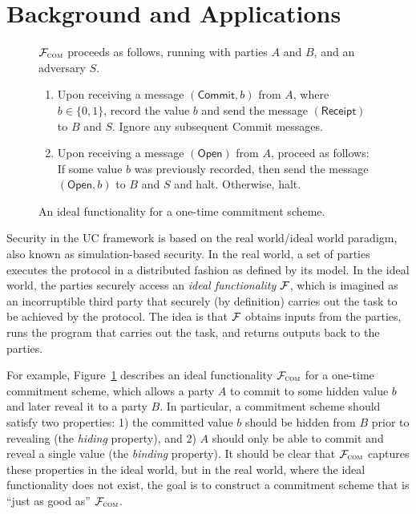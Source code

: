\section{Background and Applications}
\label{sec:background}

\begin{figure}
\begin{func}
    $\mathcal{{F}}_{\textsc{com}}$ proceeds as follows, running with parties $A$ and
  $B$, and an adversary $S$.
    \begin{enumerate}
        \item Upon receiving a message $(\mathsf{Commit}, b)$ from $A$, where $b
          \in \{ 0, 1 \}$, record the value $b$ and send the message
          $(\mathsf{Receipt})$ to $B$ and $S$. Ignore any subsequent
          \textsf{Commit} messages.
        \item Upon receiving a message $(\mathsf{Open})$ from $A$, proceed as
          follows: If some value $b$ was previously recorded, then send the
          message $(\mathsf{Open}, b)$ to $B$ and $S$ and halt. Otherwise, halt.
    \end{enumerate}
\end{func}
\caption{An ideal functionality for a one-time commitment scheme.}
\label{func:com}
\end{figure}

Security in the UC framework is based on the real world/ideal world paradigm,
also known as simulation-based security. In the real world, a set of parties
executes the protocol in a distributed fashion as defined by its model. In the
ideal world, the parties securely access an \emph{ideal functionality} $\mathcal{{F}}$,
which is imagined as an incorruptible third party that securely (by definition)
carries out the task to be achieved by the protocol. The idea is that $\mathcal{{F}}$
obtains inputs from the parties, runs the program that carries out the task, and
returns outputs back to the parties.

For example, Figure~\ref{func:com} describes an ideal functionality
$\mathcal{{F}}_{\textsc{com}}$ for a one-time commitment scheme, which allows a party
$A$ to commit to some hidden value $b$ and later reveal it to a party $B$. In
particular, a commitment scheme should satisfy two properties: 1) the committed
value $b$ should be hidden from $B$ prior to revealing (the \emph{hiding}
property), and 2) $A$ should only be able to commit and reveal a single value
(the \emph{binding} property). It should be clear that $\mathcal{{F}}_{\textsc{com}}$
captures these properties in the ideal world, but in the real world, where the
ideal functionality does not exist, the goal is to construct a commitment scheme
that is ``just as good as'' $\mathcal{{F}}_{\textsc{com}}$.

